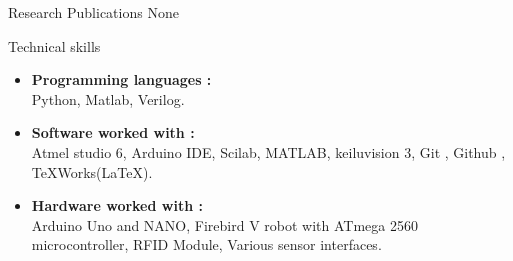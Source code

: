 \documentclass{resume} %
\begin{document}
\begin{rSection}{Research Publications}
None
\end{rSection}

\vspace{1cm}



\begin{rSection}{Technical skills}
\begin{itemize}
    \item {\bf Programming languages :} \\
     Python, Matlab, Verilog.
     \item {\bf Software worked with :} \\
     Atmel studio 6, Arduino IDE, Scilab, MATLAB, keiluvision 3, Git , Github , TeXWorks(LaTeX).
     \item {\bf Hardware worked with :} \\
     Arduino Uno and NANO, Firebird V robot with ATmega 2560 microcontroller, RFID Module, Various sensor interfaces.
     
\end{itemize}
\end{rSection}
\end{document}

